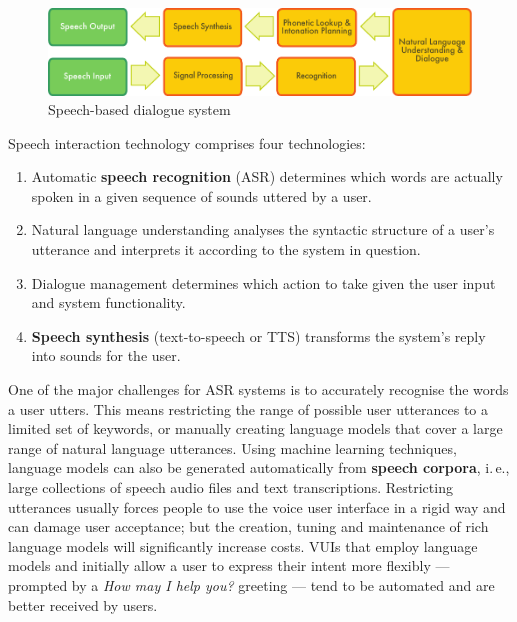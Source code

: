 \documentclass[]{../metanetpaper}
\begin{document}
\begin{multicols}{2}
\begin{figure}[htb]
  \center
  \includegraphics[width=\textwidth]{../_media/english/simple_speech-based_dialogue_architecture}
  \caption{Speech-based dialogue system}
  \label{fig:dialoguearch_en}
\end{figure}

Speech interaction technology comprises four technologies: 

\begin{enumerate}
\item Automatic \textbf{speech recognition} (ASR) determines which words are actually spoken in a given sequence of sounds uttered by a user.  
\item Natural language understanding analyses the syntactic structure of a user’s utterance and interprets it according to the system in question.
\item Dialogue management determines which action to take given the user input and system functionality.   
\item \textbf{Speech synthesis} (text-to-speech or TTS) transforms the system’s reply into sounds for the user.
\end{enumerate}

One of the major challenges for ASR systems is to accurately recognise the words a user utters. This means restricting the range of possible user utterances to a limited set of keywords, or manually creating language models that cover a large range of natural language utterances. Using machine learning techniques, language models can also be generated automatically from \textbf{speech corpora}, i.\,e., large collections of speech audio files and text transcriptions. Restricting utterances usually forces people to use the voice user interface in a rigid way and can damage user acceptance; but the creation, tuning and maintenance of rich language models will significantly increase costs. VUIs that employ language models and initially allow a user to express their intent more flexibly — prompted by a \textit{How may I help you?} greeting — tend to be automated and are better received by users.


\end{multicols}
\end{document}
